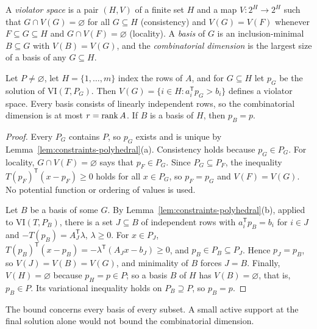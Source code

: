 A \emph{violator space} \citep{GaertnerMatousekRuestSkovron2008} is a pair
$(H,V)$ of a finite set $H$ and a map $V:2^H\to2^H$ such that
$G\cap V(G)=\varnothing$ for all $G\subseteq H$ (consistency) and
$V(G)=V(F)$ whenever $F\subseteq G\subseteq H$ and $G\cap V(F)=\varnothing$
(locality). A \emph{basis} of $G$ is an inclusion-minimal $B\subseteq G$ with
$V(B)=V(G)$, and the \emph{combinatorial dimension} is the largest size of a
basis of any $G\subseteq H$.

\begin{lemma}
\label{lem:constraints-violator}
Let $P\ne\varnothing$, let $H=\{1,\ldots,m\}$ index the rows of $A$, and for
$G\subseteq H$ let $p_G$ be the solution of $\mathrm{VI}(T,P_G)$. Then
$V(G)=\{i\in H:a_i^{\mathsf T}p_G>b_i\}$ defines a violator space. Every basis
consists of linearly independent rows, so the combinatorial dimension is at
most $r=\operatorname{rank} A$. If $B$ is a basis of $H$, then $p_B=p$.
\end{lemma}

\begin{proof}
Every $P_G$ contains $P$, so $p_G$ exists and is unique by
Lemma~\ref{lem:constraints-polyhedral}(a). Consistency holds because
$p_G\in P_G$. For locality, $G\cap V(F)=\varnothing$ says that $p_F\in P_G$.
Since $P_G\subseteq P_F$, the inequality $T(p_F)^{\mathsf T}(x-p_F)\ge0$ holds
for all $x\in P_G$, so $p_F=p_G$ and $V(F)=V(G)$. No potential function or
ordering of values is used.

Let $B$ be a basis of some $G$. By Lemma~\ref{lem:constraints-polyhedral}(b),
applied to $\mathrm{VI}(T,P_B)$, there is a set $J\subseteq B$ of independent
rows with $a_i^{\mathsf T}p_B=b_i$ for $i\in J$ and
$-T(p_B)=A_J^{\mathsf T}\lambda$, $\lambda\ge0$. For $x\in P_J$,
$T(p_B)^{\mathsf T}(x-p_B)=-\lambda^{\mathsf T}(A_Jx-b_J)\ge0$, and
$p_B\in P_B\subseteq P_J$. Hence $p_J=p_B$, so $V(J)=V(B)=V(G)$, and
minimality of $B$ forces $J=B$. Finally, $V(H)=\varnothing$ because $p_H=p\in P$;
so a basis $B$ of $H$ has $V(B)=\varnothing$, that is, $p_B\in P$. Its
variational inequality holds on $P_B\supseteq P$, so $p_B=p$.
\end{proof}

The bound concerns every basis of every subset. A small active support at the
final solution alone would not bound the combinatorial dimension.

